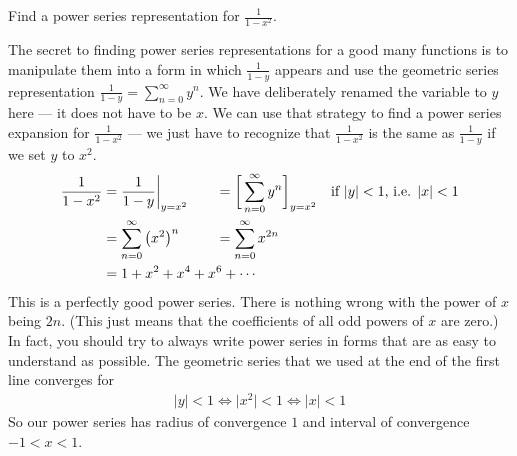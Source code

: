 \begin{eg}[$\frac{1}{1-x^2}$]\label{eg:SRpsrepAA}
Find a power series representation for $\frac{1}{1-x^2}$.

\soln
The secret to finding power series representations for a good many functions
is to manipulate them into a form in which $\frac{1}{1-y}$ appears
and use the geometric series representation
$\frac{1}{1-y} = \sum_{n=0}^\infty y^n$. We have deliberately renamed
the variable to $y$ here --- it does not have to be $x$. We can use that
strategy to find a power series expansion for $\frac{1}{1-x^2}$ --- we
just have to recognize that $\frac{1}{1-x^2}$ is the same as
$\frac{1}{1-y}$ if we set $y$ to $x^2$.
\begin{alignat*}{3}
\frac{1}{1-x^2} &= \frac{1}{1-y}\bigg|_{y=x^2}\quad &
             &=\bigg[\sum_{n=0}^\infty y^n
                                     \bigg]_{y=x^2}
                   \quad\text{if $|y|<1$, i.e. $|x|<1$} \\
             &= \sum_{n=0}^\infty {\big(x^2\big)}^n &
             &= \sum_{n=0}^\infty x^{2n} \\
             &= 1+x^2+x^4+x^6  +\cdots \hidewidth
\end{alignat*}
This is a perfectly good power series. There is nothing wrong with the
power of $x$ being $2n$. (This just means that the coefficients of all odd powers of $x$ are zero.) In fact, you should try to always write power
series in forms that are as easy to understand as possible. The geometric
series that we used at the end of the first line converges for
\begin{align*}
|y|<1
\iff  \big|x^2\big|<1
\iff |x|<1
\end{align*}
So our power series has radius of convergence $1$ and interval of
convergence $-1<x<1$.
\end{eg}



